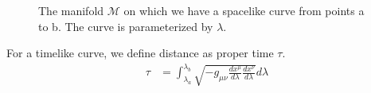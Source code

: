 \documentclass[11pt]{article}
\begin{document}
\begin{figure} [H]
\begin{centering}
\caption{The manifold $\mathcal{M}$ on which we have a spacelike curve from points a to b. The curve is parameterized by $\lambda$.}
\end{centering}
\end{figure}
    
    For a timelike curve, we define distance as proper time $\tau$.
        \begin{equation}
            \begin{aligned}
            \tau &= \int_{\lambda_a}^{\lambda_b} \sqrt {-g_{\mu\nu}\frac{dx^\mu}{d\lambda}\frac{dx^\nu}{d\lambda}} d\lambda
            \end{aligned}
        \end{equation}
        
\end{document}
